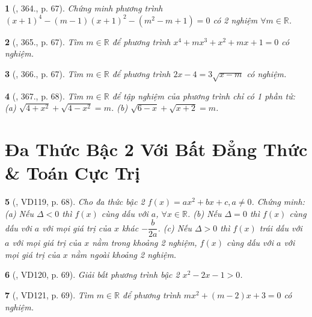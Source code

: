 \documentclass{article}
\newtheorem{baitoan}{}
\begin{document}
\begin{baitoan}[\cite{Binh_Toan_9_tap_2}, 364., p. 67]
	Chứng minh phương trình $(x + 1)^4 - (m - 1)(x + 1)^2 - (m^2 - m + 1) = 0$ có 2 nghiệm $\forall m\in\mathbb{R}$.
\end{baitoan}

\begin{baitoan}[\cite{Binh_Toan_9_tap_2}, 365., p. 67]
	Tìm $m\in\mathbb{R}$ để phương trình $x^4 + mx^3 + x^2 + mx + 1 = 0$ có nghiệm.
\end{baitoan}

\begin{baitoan}[\cite{Binh_Toan_9_tap_2}, 366., p. 67]
	Tìm $m\in\mathbb{R}$ để phương trình $2x - 4 = 3\sqrt{x - m}$ có nghiệm.
\end{baitoan}

\begin{baitoan}[\cite{Binh_Toan_9_tap_2}, 367., p. 68]
	Tìm $m\in\mathbb{R}$ để tập nghiệm của phương trình chỉ có 1 phần tử: (a) $\sqrt{4 + x^2} + \sqrt{4 - x^2} = m$. (b) $\sqrt{6 - x} + \sqrt{x + 2} = m$.
\end{baitoan}


\section{Đa Thức Bậc 2 Với Bất Đẳng Thức \& Toán Cực Trị}

\begin{baitoan}[\cite{Binh_Toan_9_tap_2}, VD119, p. 68]
	Cho đa thức bậc 2 $f(x) = ax^2 + bx + c,a\ne0$. Chứng minh: (a) Nếu $\Delta < 0$ thì $f(x)$ cùng dấu với $a$, $\forall x\in\mathbb{R}$. (b) Nếu $\Delta = 0$ thì $f(x)$ cùng dấu với $a$ với mọi giá trị của $x$ khác $-\dfrac{b}{2a}$. (c) Nếu $\Delta > 0$ thì $f(x)$ trái dấu với $a$ với mọi giá trị của $x$ nằm trong khoảng 2 nghiệm, $f(x)$ cùng dấu với $a$ với mọi giá trị của $x$ nằm ngoài khoảng 2 nghiệm.
\end{baitoan}

\begin{baitoan}[\cite{Binh_Toan_9_tap_2}, VD120, p. 69]
	Giải bất phương trình bậc 2 $x^2 - 2x - 1 > 0$.
\end{baitoan}

\begin{baitoan}[\cite{Binh_Toan_9_tap_2}, VD121, p. 69]
	Tìm $m\in\mathbb{R}$ để phương trình $mx^2 + (m - 2)x + 3 = 0$ có nghiệm.
\end{baitoan}
\end{document}
